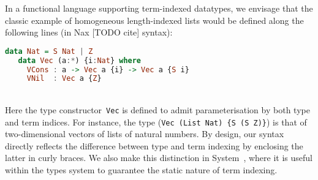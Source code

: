In a functional language supporting term-indexed datatypes, we envisage
that the classic example of homogeneous length-indexed lists would be
defined along the following lines (in Nax [TODO cite] syntax):\vspace{-5pt}
\begin{lstlisting}[basicstyle={\ttfamily},language=Haskell]
   data Nat = S Nat | Z 
   data Vec (a:*) {i:Nat} where
     VCons : a -> Vec a {i} -> Vec a {S i}
     VNil  : Vec a {Z}
\end{lstlisting}~\vspace{-15pt}\\ \noindent
Here the type constructor~{\tt Vec} is defined to admit parameterisation
by both type and term indices.  For instance, the type 
(\verb|Vec (List Nat) {S (S Z)}|) is that of two-dimensional
vectors of lists of natural numbers.  By design, our syntax directly
reflects the difference between type and term indexing by enclosing
the latter in curly braces.  We also make this distinction in 
System~\Fi, where it is useful within the types system
to guarantee the static nature of term indexing.

